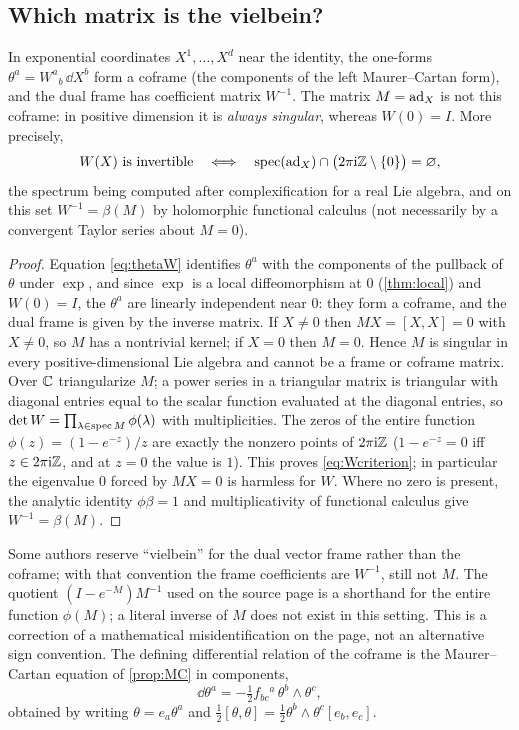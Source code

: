 \subsection{Which matrix is the vielbein?}
\begin{proposition}\label{prop:coframe}
In exponential coordinates $X^1,\ldots,X^d$ near the identity, the one-forms
$\theta^a=W^a{}_b\,\dd X^b$ form a coframe (the components of the left
Maurer--Cartan form), and the dual frame has coefficient matrix $W^{-1}$.
The matrix $M=\operatorname{ad}_X$ is not this coframe: in positive dimension it is
\emph{always singular}, whereas $W(0)=I$. More precisely,
\begin{equation}\label{eq:Wcriterion}
 W(X)\text{ is invertible}\quad\Longleftrightarrow\quad
 \operatorname{spec}(\operatorname{ad}_X)\cap\bigl(2\pi\mathrm{i}\mathbb{Z}\setminus\{0\}\bigr)=\varnothing,
\end{equation}
the spectrum being computed after complexification for a real Lie algebra,
and on this set $W^{-1}=\beta(M)$ by holomorphic functional calculus (not
necessarily by a convergent Taylor series about $M=0$).
\end{proposition}
\begin{proof}
Equation \eqref{eq:thetaW} identifies $\theta^a$ with the components of
the pullback of $\theta$ under $\exp$, and since $\exp$ is a local
diffeomorphism at $0$ (\cref{thm:local}) and $W(0)=I$, the $\theta^a$ are
linearly independent near $0$: they form a coframe, and the dual frame is
given by the inverse matrix. If $X\neq0$ then $MX=[X,X]=0$ with $X\neq0$,
so $M$ has a nontrivial kernel; if $X=0$ then $M=0$. Hence $M$ is singular
in every positive-dimensional Lie algebra and cannot be a frame or coframe
matrix. Over $\mathbb{C}$ triangularize $M$; a power series in a triangular matrix
is triangular with diagonal entries equal to the scalar function evaluated
at the diagonal entries, so $\det W=\prod_{\lambda\in\operatorname{spec} M}\phi(\lambda)$
with multiplicities. The zeros of the entire function $\phi(z)=(1-e^{-z})/z$
are exactly the nonzero points of $2\pi\mathrm{i}\mathbb{Z}$ ($1-e^{-z}=0$ iff
$z\in2\pi\mathrm{i}\mathbb{Z}$, and at $z=0$ the value is $1$). This proves
\eqref{eq:Wcriterion}; in particular the eigenvalue $0$ forced by
$MX=0$ is harmless for $W$. Where no zero is present, the analytic
identity $\phi\beta=1$ and multiplicativity of functional calculus give
$W^{-1}=\beta(M)$.
\end{proof}
Some authors reserve ``vielbein'' for the dual vector frame rather than
the coframe; with that convention the frame coefficients are $W^{-1}$,
still not $M$. The quotient $(I-e^{-M})M^{-1}$ used on the source page is a
shorthand for the entire function $\phi(M)$; a literal inverse of $M$ does
not exist in this setting. This is a correction of a mathematical
misidentification on the page, not an alternative sign convention. The
defining differential relation of the coframe is the Maurer--Cartan
equation of \cref{prop:MC} in components,
\begin{equation}\label{eq:structureequation}
 \dd\theta^a=-\tfrac12f_{bc}{}^a\,\theta^b\wedge\theta^c,
\end{equation}
obtained by writing $\theta=e_a\theta^a$ and
$\frac12[\theta,\theta]=\frac12\theta^b\wedge\theta^c[e_b,e_c]$.

